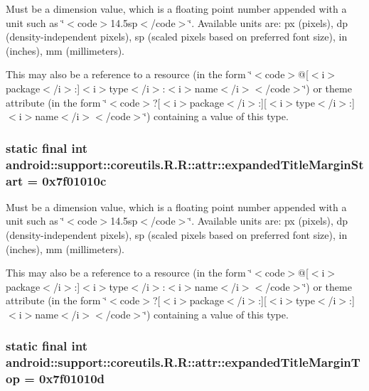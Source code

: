 Must be a dimension value, which is a floating point number appended with a unit such as \char`\"{}$<$code$>$14.5sp$<$/code$>$\char`\"{}. Available units are: px (pixels), dp (density-independent pixels), sp (scaled pixels based on preferred font size), in (inches), mm (millimeters). 

This may also be a reference to a resource (in the form \char`\"{}$<$code$>$@\mbox{[}$<$i$>$package$<$/i$>$:\mbox{]}$<$i$>$type$<$/i$>$:$<$i$>$name$<$/i$>$$<$/code$>$\char`\"{}) or theme attribute (in the form \char`\"{}$<$code$>$?\mbox{[}$<$i$>$package$<$/i$>$:\mbox{]}\mbox{[}$<$i$>$type$<$/i$>$:\mbox{]}$<$i$>$name$<$/i$>$$<$/code$>$\char`\"{}) containing a value of this type. \hypertarget{classandroid_1_1support_1_1coreutils_1_1_r_1_1attr_50baef19e96f14f616342573881a4268}{
\subsubsection[{expandedTitleMarginStart}]{\setlength{\rightskip}{0pt plus 5cm}static final int android::support::coreutils.R.R::attr::expandedTitleMarginStart = 0x7f01010c}}
\label{classandroid_1_1support_1_1coreutils_1_1_r_1_1attr_50baef19e96f14f616342573881a4268}


Must be a dimension value, which is a floating point number appended with a unit such as \char`\"{}$<$code$>$14.5sp$<$/code$>$\char`\"{}. Available units are: px (pixels), dp (density-independent pixels), sp (scaled pixels based on preferred font size), in (inches), mm (millimeters). 

This may also be a reference to a resource (in the form \char`\"{}$<$code$>$@\mbox{[}$<$i$>$package$<$/i$>$:\mbox{]}$<$i$>$type$<$/i$>$:$<$i$>$name$<$/i$>$$<$/code$>$\char`\"{}) or theme attribute (in the form \char`\"{}$<$code$>$?\mbox{[}$<$i$>$package$<$/i$>$:\mbox{]}\mbox{[}$<$i$>$type$<$/i$>$:\mbox{]}$<$i$>$name$<$/i$>$$<$/code$>$\char`\"{}) containing a value of this type. \hypertarget{classandroid_1_1support_1_1coreutils_1_1_r_1_1attr_1616a80512abe6381ea59fd5eb53cf1e}{
\subsubsection[{expandedTitleMarginTop}]{\setlength{\rightskip}{0pt plus 5cm}static final int android::support::coreutils.R.R::attr::expandedTitleMarginTop = 0x7f01010d}}
\label{classandroid_1_1support_1_1coreutils_1_1_r_1_1attr_1616a80512abe6381ea59fd5eb53cf1e}


